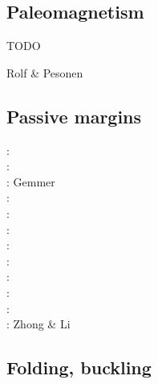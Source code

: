 \subsection{Paleomagnetism} 

TODO

Rolf \& Pesonen \cite{rope18}



\subsection{Passive margins} 

\begin{scriptsize}
\nineteeneightytwo: \cite{clwv82}\\
\nineteeneightysix: \cite{lies86}\\
\twothousandfive: Gemmer \etal \cite{gebi05}\\
\twothousandeight: \cite{clbz08}\cite{kasb08}\\
\twothousandten: \cite{fasm10}\cite{nigm10}\\
\twothousandeleven: \cite{rapy11}\cite{nigm11}\cite{brfo11}\\
\twothousandthirteen: \cite{mana13}\cite{yahb13}\\
\twothousandfourteen: \cite{macg14}\\
\twothousandfifteen: \cite{gebw15}\cite{nigo15}\\
\twothousandsixteen: \cite{dupm16}\\
\twothousandeighteen: \cite{sahf18}\cite{mube18}\cite{tebu18}\\
\twothousandnineteen: Zhong \& Li \cite{zhli19}
\end{scriptsize}


\subsection{Folding, buckling} 

